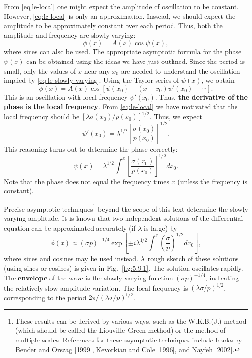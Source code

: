From \eqref{eq:le-local} one might expect the amplitude of oscillation to be constant.  However, \eqref{eq:le-local} is only an approximation.  Instead, we should expect the amplitude to be approximately constant over each period.  Thus, both the amplitude and frequency are slowly varying:
\begin{equation}
\label{eq:le-slowly-varying}
\phi(x) = A(x)\cos\psi(x),
\end{equation}
where sines can also be used.  The appropriate asymptotic formula for the phase $\psi(x)$ can be obtained using the ideas we have just outlined.  Since the period is small, only the values of $x$ near any $x_0$ are needed to understand the oscillation implied by \eqref{eq:le-slowly-varying}.  Using the Taylor series of $\psi(x)$, we obtain
\begin{equation}
\label{eq:le-local-phase}
\phi(x) = A(x)\cos[\psi(x_0) + (x - x_0)\psi'(x_0) + \cdots].
\end{equation}
This is an oscillation with local frequency $\psi'(x_0)$.  Thus, \textbf{the derivative of the phase is the local frequency}.  From \eqref{eq:le-local} we have motivated that the local frequency should be $[\lambda\sigma(x_0)/p(x_0)]^{1/2}$.  Thus, we expect
\begin{equation}
\label{eq:le-phase-deriv}
\psi'(x_0) = \lambda^{1/2}\left[\frac{\sigma(x_0)}{p(x_0)}\right]^{1/2}.
\end{equation}
This reasoning turns out to determine the phase correctly:
\begin{equation}
\label{eq:le-phase}
\psi(x) = \lambda^{1/2}\int^x \left[\frac{\sigma(x_0)}{p(x_0)}\right]^{1/2}dx_0.
\end{equation}
Note that the phase does not equal the frequency times $x$ (unless the frequency is constant).

Precise asymptotic techniques\footnote{These results can be derived by various ways, such as the W.K.B.(J.) method (which should be called the Liouville--Green method) or the method of multiple scales.  References for these asymptotic techniques include books by Bender and Orszag [1999], Kevorkian and Cole [1996], and Nayfeh [2002].} beyond the scope of this text determine the slowly varying amplitude.  It is known that two independent solutions of the differential equation can be approximated accurately (if $\lambda$ is large) by
\begin{equation}
\label{eq:le-wkb}
\boxed{\phi(x) \approx (\sigma p)^{-1/4}\exp\left[\pm i\lambda^{1/2}\int^x \left(\frac{\sigma}{p}\right)^{1/2}dx_0\right],}
\end{equation}
where sines and cosines may be used instead.  A rough sketch of these solutions (using sines or cosines) is given in Fig.~\ref{fig:5.9.1}.  The solution oscillates rapidly.  The \textbf{envelope} of the wave is the slowly varying function $(\sigma p)^{-1/4}$, indicating the relatively slow amplitude variation.  The local frequency is $(\lambda\sigma/p)^{1/2}$, corresponding to the period $2\pi/(\lambda\sigma/p)^{1/2}$.

